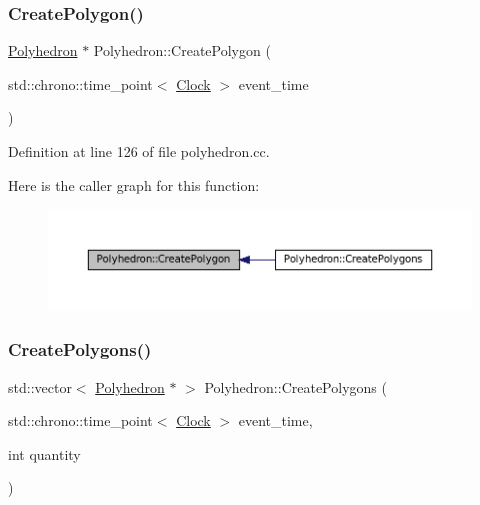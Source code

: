 \subsubsection{\texorpdfstring{Create\+Polygon()}{CreatePolygon()}}
{\footnotesize\ttfamily \mbox{\hyperlink{class_polyhedron}{Polyhedron}} $\ast$ Polyhedron\+::\+Create\+Polygon (\begin{DoxyParamCaption}\item[{std\+::chrono\+::time\+\_\+point$<$ \mbox{\hyperlink{universe_8h_a0ef8d951d1ca5ab3cfaf7ab4c7a6fd80}{Clock}} $>$}]{event\+\_\+time }\end{DoxyParamCaption})}



Definition at line 126 of file polyhedron.\+cc.

Here is the caller graph for this function\+:\nopagebreak
\begin{figure}[H]
\begin{center}
\leavevmode
\includegraphics[width=350pt]{class_polyhedron_ae5852dd26065d9f38ed293f8d95106ad_icgraph}
\end{center}
\end{figure}
\mbox{\label{class_polyhedron_a1848eb8747c1132c40c2d27336af2896}} 
\subsubsection{\texorpdfstring{Create\+Polygons()}{CreatePolygons()}}
{\footnotesize\ttfamily std\+::vector$<$ \mbox{\hyperlink{class_polyhedron}{Polyhedron}} $\ast$ $>$ Polyhedron\+::\+Create\+Polygons (\begin{DoxyParamCaption}\item[{std\+::chrono\+::time\+\_\+point$<$ \mbox{\hyperlink{universe_8h_a0ef8d951d1ca5ab3cfaf7ab4c7a6fd80}{Clock}} $>$}]{event\+\_\+time,  }\item[{int}]{quantity }\end{DoxyParamCaption})}



